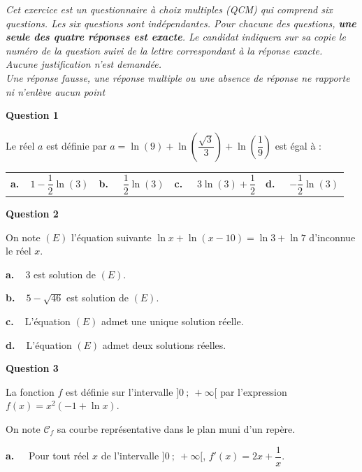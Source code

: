 \bigskip

\emph{Cet exercice est un questionnaire à choix multiples (QCM)
 qui comprend six questions. Les six questions sont indépendantes. Pour chacune des questions, \textbf{une seule des quatre réponses est exacte}. Le candidat indiquera sur sa copie le numéro de la question suivi de la lettre correspondant à la réponse exacte.\\
Aucune justification n'est demandée.\\
Une réponse fausse, une réponse multiple ou une absence de réponse ne rapporte ni n'enlève aucun point}

\medskip

\textbf{Question 1}

\medskip

Le réel $a$ est définie par $a = \ln (9) + \ln \left(\dfrac{\sqrt{3}}{3} \right)  + \ln \left(\dfrac19 \right)$ est égal à :

\begin{center}
\begin{tabularx}{\linewidth}{*{4}{X}}
\textbf{a.~~}$1 - \dfrac12 \ln (3)$&\textbf{b.~~} $\dfrac12 \ln (3)$&\textbf{c.~~} $3 \ln (3) + \dfrac12$ &\textbf{d.~~} $- \dfrac12 \ln (3)$
\end{tabularx}
\end{center}
 
\medskip

\textbf{Question 2}

\medskip

On note $(E)$ l'équation suivante $\ln x + \ln (x - 10) = \ln 3 + \ln 7$ d'inconnue le réel $x$.

\medskip
\textbf{a.~~}3 est solution de $(E)$.

\textbf{b.~~}$5 - \sqrt{46}$ est solution de $(E)$.

\textbf{c.~~}L'équation $(E)$ admet une unique solution réelle.

\textbf{d.~~}L'équation $(E)$ admet deux solutions réelles.

\medskip

\textbf{Question 3}

\medskip

La fonction $f$ est définie sur l'intervalle $]0~;~+ \infty[$ par l'expression $f(x) = x^2(- 1 + \ln x)$.

On note $\mathcal{C}_f$ sa courbe représentative dans le plan muni d'un repère.

\textbf{a.~~} Pour tout réel $x$ de l'intervalle $]0~;~+ \infty[$, \: $f'(x) = 2x + \dfrac1x$.

